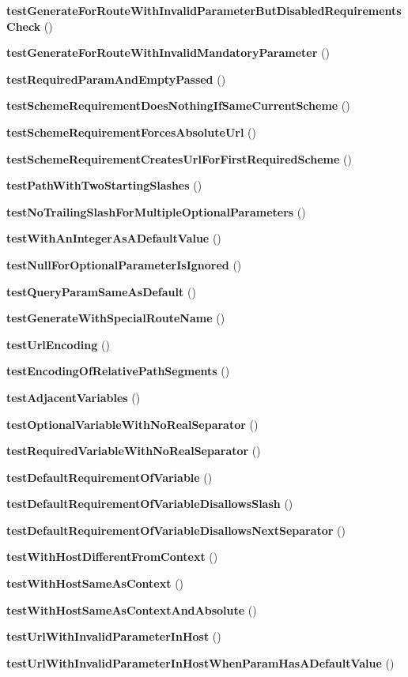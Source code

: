\begin{DoxyCompactItemize}
\item 
{\bf test\+Generate\+For\+Route\+With\+Invalid\+Parameter\+But\+Disabled\+Requirements\+Check} ()
\item 
{\bf test\+Generate\+For\+Route\+With\+Invalid\+Mandatory\+Parameter} ()
\item 
{\bf test\+Required\+Param\+And\+Empty\+Passed} ()
\item 
{\bf test\+Scheme\+Requirement\+Does\+Nothing\+If\+Same\+Current\+Scheme} ()
\item 
{\bf test\+Scheme\+Requirement\+Forces\+Absolute\+Url} ()
\item 
{\bf test\+Scheme\+Requirement\+Creates\+Url\+For\+First\+Required\+Scheme} ()
\item 
{\bf test\+Path\+With\+Two\+Starting\+Slashes} ()
\item 
{\bf test\+No\+Trailing\+Slash\+For\+Multiple\+Optional\+Parameters} ()
\item 
{\bf test\+With\+An\+Integer\+As\+A\+Default\+Value} ()
\item 
{\bf test\+Null\+For\+Optional\+Parameter\+Is\+Ignored} ()
\item 
{\bf test\+Query\+Param\+Same\+As\+Default} ()
\item 
{\bf test\+Generate\+With\+Special\+Route\+Name} ()
\item 
{\bf test\+Url\+Encoding} ()
\item 
{\bf test\+Encoding\+Of\+Relative\+Path\+Segments} ()
\item 
{\bf test\+Adjacent\+Variables} ()
\item 
{\bf test\+Optional\+Variable\+With\+No\+Real\+Separator} ()
\item 
{\bf test\+Required\+Variable\+With\+No\+Real\+Separator} ()
\item 
{\bf test\+Default\+Requirement\+Of\+Variable} ()
\item 
{\bf test\+Default\+Requirement\+Of\+Variable\+Disallows\+Slash} ()
\item 
{\bf test\+Default\+Requirement\+Of\+Variable\+Disallows\+Next\+Separator} ()
\item 
{\bf test\+With\+Host\+Different\+From\+Context} ()
\item 
{\bf test\+With\+Host\+Same\+As\+Context} ()
\item 
{\bf test\+With\+Host\+Same\+As\+Context\+And\+Absolute} ()
\item 
{\bf test\+Url\+With\+Invalid\+Parameter\+In\+Host} ()
\item 
{\bf test\+Url\+With\+Invalid\+Parameter\+In\+Host\+When\+Param\+Has\+A\+Default\+Value} ()

\end{DoxyCompactItemize}

